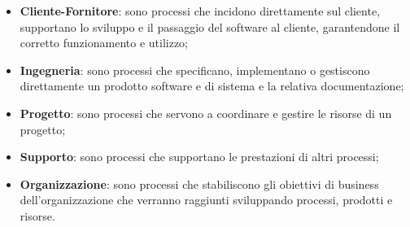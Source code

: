\documentclass[../norme-di-progetto.tex]{subfiles}
\begin{document}
\begin{itemize}
    \item \textbf{Cliente-Fornitore}: sono processi che incidono direttamente sul cliente, supportano lo sviluppo e il passaggio del software al cliente, garantendone il corretto funzionamento e utilizzo;
    \item \textbf{Ingegneria}: sono processi che specificano, implementano o gestiscono direttamente un prodotto software e di sistema e la relativa documentazione;
    \item \textbf{Progetto}: sono processi che servono a coordinare e gestire le risorse di un progetto;
    \item \textbf{Supporto}: sono processi che supportano le prestazioni di altri processi;
    \item \textbf{Organizzazione}: sono processi che stabiliscono gli obiettivi di business dell'organizzazione che verranno raggiunti sviluppando processi, prodotti e risorse.
\end{itemize}
\end{document}
